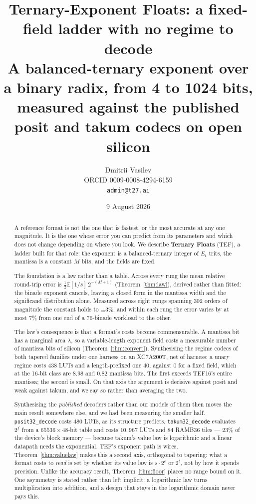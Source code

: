 \documentclass[11pt]{article}
\title{Ternary-Exponent Floats: a fixed-field ladder with no regime to decode \\
  \large A balanced-ternary exponent over a binary radix, from 4 to 1024 bits,
  measured against the published posit and takum codecs on open silicon}
\author{Dmitrii Vasilev\\
  \small ORCID 0009-0008-4294-6159 \\
  \small \texttt{admin@t27.ai}}
\date{9 August 2026}
\theoremstyle{definition}
\begin{document}
\maketitle

\begin{abstract}
A reference format is not the one that is fastest, or the most accurate at any one
magnitude. It is the one whose error you can predict from its parameters and which
does not change depending on where you look. We describe \textbf{Ternary Floats}
(TEF), a ladder built for that role: the exponent is a balanced-ternary integer of
$E_t$ trits, the mantissa is a constant $M$ bits, and the fields are fixed.

The foundation is a law rather than a table. Across every rung the mean relative
round-trip error is $\tfrac12\mathbb{E}[1/s]\,2^{-(M+1)}$
(Theorem~\ref{thm:law}), derived rather than fitted: the binade exponent cancels,
leaving a closed form in the mantissa width and the significand distribution
alone. Measured across eight rungs spanning 302 orders of magnitude the constant
holds to $\pm3\%$, and within each rung the error varies by at most $7\%$ from one
end of a 76-binade workload to the other.

The law's consequence is that a format's costs become commensurable. A mantissa
bit has a marginal area $\lambda$, so a variable-length exponent field costs a
measurable number of mantissa bits of silicon (Theorem~\ref{thm:convert}).
Synthesising the regime codecs of both tapered families under one harness on an
XC7A200T, net of harness: a unary regime costs $438$ LUTs and a length-prefixed
one $40$, against $0$ for a fixed field, which at the 16-bit class are $8.98$ and
$0.82$ mantissa bits. The first exceeds TEF16's entire mantissa; the second is
small. On that axis the argument is decisive against posit and weak against takum,
and we say so rather than averaging the two.

Synthesising the \emph{published} decoders rather than our models of them then
moves the main result somewhere else, and we had been measuring the smaller half.
\texttt{posit32\_decode} costs $480$ LUTs, as its structure predicts.
\texttt{takum32\_decode} evaluates $2^{f}$ from a $65536\times 48$-bit table and
costs $10{,}967$ LUTs and $84$ RAMB36 tiles --- $23\%$ of the device's block
memory --- because takum's value law is logarithmic and a linear datapath needs
the exponential. TEF's exponent path is wires. Theorem~\ref{thm:valuelaw} makes
this a second axis, orthogonal to tapering: what a format costs to \emph{read} is
set by whether its value law is $s\cdot 2^{e}$ or $2^{\ell}$, not by how it spends
precision. Unlike the accuracy result, Theorem~\ref{thm:floor} places no range
bound on it. One asymmetry is stated rather than left implicit: a logarithmic law
turns multiplication into addition, and a design that stays in the logarithmic
domain never pays this.


\end{abstract}
\end{document}
